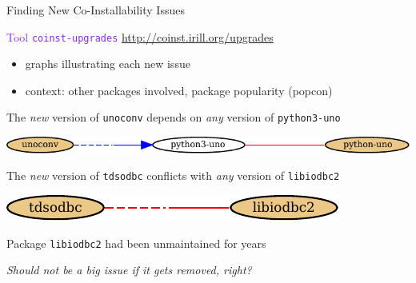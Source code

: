 \documentclass[xcolor={dvipsnames}]{beamer}
\newcommand{\EEE}[1]{\textcolor{BlueViolet}{#1}}
\begin{document}
\begin{frame}{Finding New Co-Installability Issues}

\EEE{Tool \texttt{coinst-upgrades}}
\hspace{1cm}
\url{http://coinst.irill.org/upgrades}
\begin{itemize}
\item graphs illustrating each new issue
\item context: other packages involved, package popularity (popcon)
\end{itemize}

\vspace{2em}



The \emph{new} version of \texttt{unoconv} depends on \emph{any}
version of \texttt{python3-uno}
\begin{center}
\includegraphics[scale=0.8]{python-uno}
\end{center}

The \emph{new} version of \texttt{tdsodbc} conflicts with \emph{any}
version of \texttt{libiodbc2}
\begin{center}
\includegraphics[scale=0.8]{libiodbc2}
\end{center}

\pause

Package \texttt{libiodbc2} had been unmaintained for years

\emph{Should not be a big issue if it gets removed, right?}

\end{frame}
\end{document}
